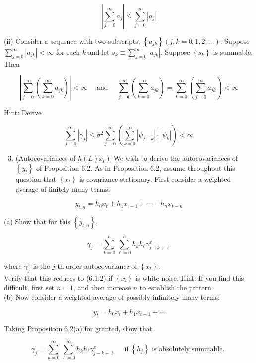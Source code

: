 \documentclass[10pt]{article}
\begin{document}
$$
\left|\sum_{j=0}^{\infty} a_{j}\right| \leq \sum_{j=0}^{\infty}\left|a_{j}\right|
$$

(ii) Consider a sequence with two subscripts, $\left\{a_{j k}\right\}(j, k=0,1,2, \ldots)$. Suppose $\sum_{j=0}^{\infty}\left|a_{j k}\right|<\infty$ for each $k$ and let $s_{k} \equiv \sum_{j=0}^{\infty}\left|a_{j k}\right|$. Suppose $\left\{s_{k}\right\}$ is summable. Then

$$
\left|\sum_{j=0}^{\infty}\left(\sum_{k=0}^{\infty} a_{j k}\right)\right|<\infty \quad \text { and } \quad \sum_{j=0}^{\infty}\left(\sum_{k=0}^{\infty} a_{j k}\right)=\sum_{k=0}^{\infty}\left(\sum_{j=0}^{\infty} a_{j k}\right)<\infty
$$

Hint: Derive

$$
\sum_{j=0}^{\infty}\left|\gamma_{j}\right| \leq \sigma^{2} \sum_{j=0}^{\infty}\left(\sum_{k=0}^{\infty}\left|\psi_{j+k}\right| \cdot\left|\psi_{k}\right|\right)<\infty
$$

\begin{enumerate}
  \setcounter{enumi}{2}
  \item (Autocovariances of $\left.h(L) x_{t}\right)$ We wish to derive the autocovariances of $\left\{y_{t}\right\}$ of Proposition 6.2. As in Proposition 6.2, assume throughout this question that $\left\{x_{t}\right\}$ is covariance-stationary. First consider a weighted average of finitely many terms:
\end{enumerate}

$$
y_{t, n}=h_{0} x_{t}+h_{1} x_{t-1}+\cdots+h_{n} x_{t-n}
$$

(a) Show that for this $\left\{y_{t, n}\right\}$,

$$
\gamma_{j}=\sum_{k=0}^{n} \sum_{\ell=0}^{n} h_{k} h_{\ell} \gamma_{j-k+\ell}^{x}
$$

where $\gamma_{j}^{x}$ is the $j$-th order autocovariance of $\left\{x_{t}\right\}$.\\
Verify that this reduces to (6.1.2) if $\left\{x_{t}\right\}$ is white noise. Hint: If you find this difficult, first set $n=1$, and then increase $n$ to establish the pattern.\\
(b) Now consider a weighted average of possibly infinitely many terms:

$$
y_{t}=h_{0} x_{t}+h_{1} x_{t-1}+\cdots
$$

Taking Proposition 6.2(a) for granted, show that

$$
\gamma_{j}=\sum_{k=0}^{\infty} \sum_{\ell=0}^{\infty} h_{k} h_{\ell} \gamma_{j-k+\ell}^{x} \quad \text { if }\left\{h_{j}\right\} \text { is absolutely summable. }
$$
\end{document}
